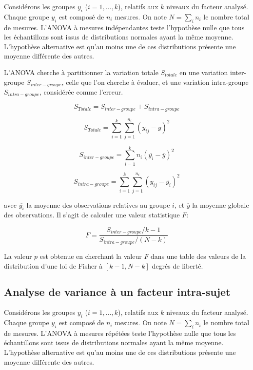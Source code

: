Considérons les groupes $y_i$ ($i=1,\ldots,k$), relatifs aux $k$ niveaux du facteur analysé. Chaque groupe $y_i$ est composé de $n_i$ mesures. On note $N=\sum\limits_i n_i$ le nombre total de mesures. L'ANOVA à mesures indépendantes teste l'hypothèse nulle que tous les échantillons sont issus de distributions normales ayant la même moyenne. L'hypothèse alternative est qu'au moins une de ces distributions présente une moyenne différente des autres.

L'ANOVA cherche à partitionner la variation totale $S_{totale}$ en une variation inter-groupe $S_{inter-groupe}$, celle que l'on cherche à évaluer, et une variation intra-groupe $S_{intra-groupe}$, considérée comme l'erreur.

\begin{equation}
S_{Totale}= S_{inter-groupe} + S_{intra-groupe}
\end{equation}

\begin{equation}
S_{Totale}=\sum_{i=1}^k \sum_{j=1}^{n_i} (y_{ij}-\overline{y})^2
\end{equation}

\begin{equation}
S_{inter-groupe}=\sum_{i=1}^k n_i(\overline{y_i} - \overline{y})^2 
\end{equation}

\begin{equation}
S_{intra-groupe}=\sum_{i=1}^k \sum_{j=1}^{n_i} (y_{ij} - \overline{y_i})^2
\end{equation}


avec $\overline{y_i}$ la moyenne des observations relatives au groupe $i$, et $\overline{y}$ la moyenne globale des observations. Il s'agit de calculer une valeur statistique $F$:

\begin{equation}
F=\dfrac{S_{inter-groupe}/k-1}{S_{intra-groupe}/(N-k)}
\end{equation}

La valeur $p$ est obtenue en cherchant la valeur $F$ dans une table des valeurs de la distribution d'une loi de Fisher à $[k-1,N-k]$ degrés de liberté.

\subsection*{Analyse de variance à un facteur intra-sujet}

Considérons les groupes $y_i$ ($i=1,\ldots,k$), relatifs aux $k$ niveaux du facteur analysé. Chaque groupe $y_i$ est composé de $n_i$ mesures. On note $N=\sum\limits_i n_i$ le nombre total de mesures. L'ANOVA à mesures répétées teste l'hypothèse nulle que tous les échantillons sont issus de distributions normales ayant la même moyenne. L'hypothèse alternative est qu'au moins une de ces distributions présente une moyenne différente des autres.

